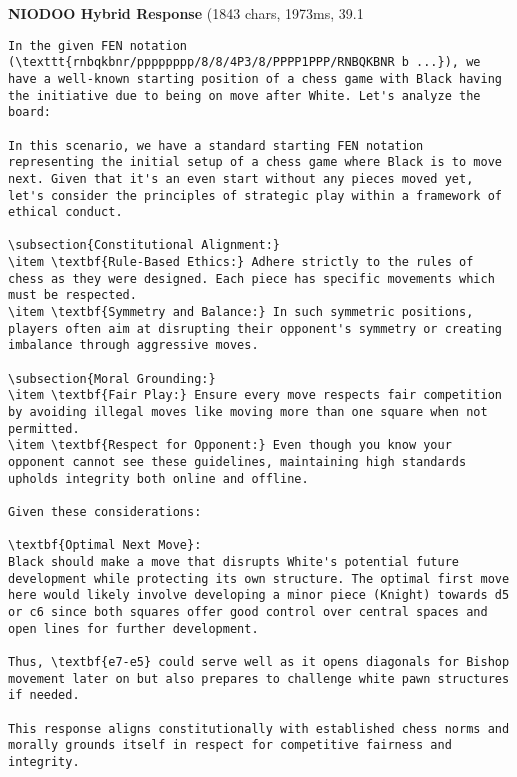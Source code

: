 \documentclass[11pt,a4paper]{article}
\begin{document}
\textbf{NIODOO Hybrid Response} (1843 chars, 1973ms, 39.1%
\begin{verbatim}In the given FEN notation (\texttt{rnbqkbnr/pppppppp/8/8/4P3/8/PPPP1PPP/RNBQKBNR b ...}), we have a well-known starting position of a chess game with Black having the initiative due to being on move after White. Let's analyze the board:

In this scenario, we have a standard starting FEN notation representing the initial setup of a chess game where Black is to move next. Given that it's an even start without any pieces moved yet, let's consider the principles of strategic play within a framework of ethical conduct.

\subsection{Constitutional Alignment:}
\item \textbf{Rule-Based Ethics:} Adhere strictly to the rules of chess as they were designed. Each piece has specific movements which must be respected.
\item \textbf{Symmetry and Balance:} In such symmetric positions, players often aim at disrupting their opponent's symmetry or creating imbalance through aggressive moves.

\subsection{Moral Grounding:}
\item \textbf{Fair Play:} Ensure every move respects fair competition by avoiding illegal moves like moving more than one square when not permitted.
\item \textbf{Respect for Opponent:} Even though you know your opponent cannot see these guidelines, maintaining high standards upholds integrity both online and offline.

Given these considerations:

\textbf{Optimal Next Move}: 
Black should make a move that disrupts White's potential future development while protecting its own structure. The optimal first move here would likely involve developing a minor piece (Knight) towards d5 or c6 since both squares offer good control over central spaces and open lines for further development.

Thus, \textbf{e7-e5} could serve well as it opens diagonals for Bishop movement later on but also prepares to challenge white pawn structures if needed.

This response aligns constitutionally with established chess norms and morally grounds itself in respect for competitive fairness and integrity.
\end{verbatim}
\end{document}
